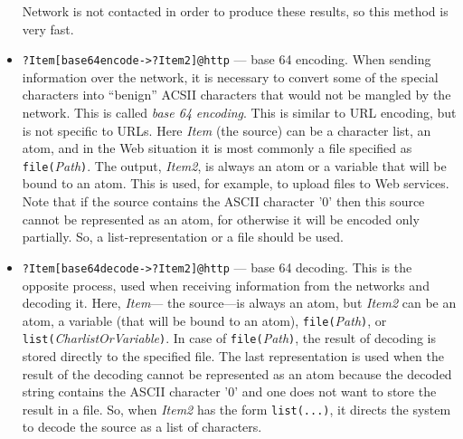\begin{itemize}
  Network is not contacted in order to produce these results, so this
  method is very fast.
\item \texttt{?Item[base64encode->?Item2]@\bs{}http} --- base 64 encoding.
  When sending information over the network, it is necessary to convert
  some of the special characters into ``benign'' ACSII characters that
  would not be mangled by the network. This is called \emph{base 64}  
  \emph{encoding}.  
  This is similar to URL encoding, but is not specific to URLs. Here
  \emph{Item} (the source) can be a character list, an atom, and in the Web
  situation it is most commonly a file specified as
  \texttt{file(}\emph{Path}\texttt{)}. The output, \emph{Item2}, is always
  an atom or a variable that will be bound to an atom.    
  This is used, for example, to upload files to Web services.
  Note that if the source contains the ASCII character '\bs{}0' then this
  source cannot be represented as an atom, for otherwise it will be encoded
  only partially. So, a list-representation or a file should be used.
\item \texttt{?Item[base64decode->?Item2]@\bs{}http} --- base 64
  decoding. This is the opposite process, used when receiving information from
  the networks and decoding it. Here, \emph{Item}--- the source---is always
  an atom, but \emph{Item2} can be an atom, a variable (that will be bound
  to an atom), \texttt{file(}\emph{Path}\texttt{)}, or
  \texttt{list(}\emph{CharlistOrVariable}\texttt{)}.    
  In case of \texttt{file(}\emph{Path}\texttt{)}, the result of decoding is
  stored directly to the specified file. The last representation is used when
  the result of the decoding cannot be represented as an atom because the
  decoded string contains the ASCII character '\bs{}0' and one does not
  want to store the result in a file. So, when
  \emph{Item2} has the form \texttt{list(...)}, it directs the system to
  decode the source as a list of characters.  
\end{itemize}





